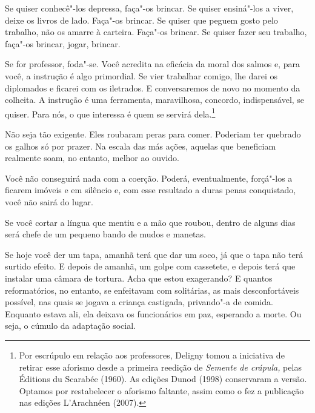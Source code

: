 Se quiser conhecê"-los depressa, faça"-os brincar. Se quiser ensiná"-los a
viver, deixe os livros de lado. Faça"-os brincar. Se quiser que peguem
gosto pelo trabalho, não os amarre à carteira. Faça"-os brincar. Se
quiser fazer seu trabalho, faça"-os brincar, jogar, brincar.

\bigskip
\bigskip

Se for professor, foda"-se. Você acredita na eficácia da moral dos salmos
e, para você, a instrução é algo primordial. Se vier trabalhar comigo,
lhe darei os diplomados e ficarei com os iletrados. E conversaremos de
novo no momento da colheita. A instrução é uma ferramenta, maravilhosa,
concordo, indispensável, se quiser. Para nós, o que interessa é quem se
servirá dela.\footnote{Por escrúpulo em relação aos professores, Deligny
  tomou a iniciativa de retirar esse aforismo desde a primeira reedição
  de \emph{Semente de crápula,} pelas Éditions du Scarabée (1960). As
  edições Dunod (1998) conservaram a versão. Optamos por restabelecer o
  aforismo faltante, assim como o fez a publicação nas edições
  L'Arachnéen (2007).}

\bigskip
\bigskip

Não seja tão exigente. Eles roubaram peras para comer. Poderiam ter
quebrado os galhos só por prazer. Na escala das más ações, aquelas que
beneficiam realmente soam, no entanto, melhor ao ouvido.

\bigskip
\bigskip

Você não conseguirá nada com a coerção. Poderá, eventualmente, forçá"-los
a ficarem imóveis e em silêncio e, com esse resultado a duras penas
conquistado, você não sairá do lugar.

\bigskip
\bigskip

Se você cortar a língua que mentiu e a mão que roubou, dentro de alguns
dias será chefe de um pequeno bando de mudos e manetas.

\bigskip
\bigskip

Se hoje você der um tapa, amanhã terá que dar um soco, já que o tapa não
terá surtido efeito. E depois de amanhã, um golpe com cassetete, e
depois terá que instalar uma câmara de tortura. Acha que estou
exagerando? E quantos reformatórios, no entanto, se enfeitavam com
solitárias, as mais desconfortáveis possível, nas quais se jogava a
criança castigada, privando"-a de comida. Enquanto estava ali, ela
deixava os funcionários em paz, esperando a morte. Ou seja, o cúmulo da
adaptação social.

\bigskip
\bigskip


